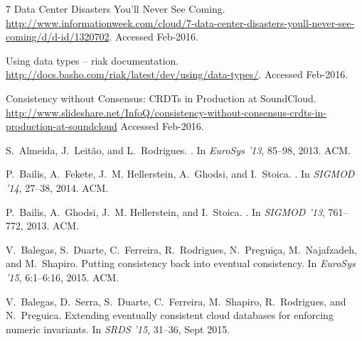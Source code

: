 \documentclass[11pt,dvipdfm]{article}
\begin{document}
\begin{thebibliography}{10}
\itemsep=1pt
\begin{small}


{7 Data Center Disasters You'll Never See Coming}.
\newblock
  \url{http://www.informationweek.com/cloud/7-data-center-disasters-youll-never-see-coming/d/d-id/1320702}.
\newblock Accessed Feb-2016.

Using data types -- riak documentation.
\newblock \url{http://docs.basho.com/riak/latest/dev/using/data-types/}.
\newblock Accessed Feb-2016.

Consistency without Consensus: CRDTs in Production at SoundCloud.
\newblock  \url{http://www.slideshare.net/InfoQ/consistency-without-consensus-crdts-in-production-at-soundcloud}
\newblock Accessed Feb-2016.

S.~Almeida, J.~Leit\~{a}o, and L.~Rodrigues.
.
  \newblock In {\em EuroSys '13}, 85--98, 2013. ACM.

P.~Bailis, A.~Fekete, J.~M. Hellerstein, A.~Ghodsi, and I.~Stoica.
.
\newblock In {\em SIGMOD '14}, 27--38, 2014. ACM.

P.~Bailis, A.~Ghodsi, J.~M. Hellerstein, and I.~Stoica.
.
\newblock In {\em SIGMOD '13}, 761--772, 2013. ACM.

V.~Balegas, S.~Duarte, C.~Ferreira, R.~Rodrigues, N.~Pregui\c{c}a,
  M.~Najafzadeh, and M.~Shapiro.
\newblock Putting consistency back into eventual consistency.
\newblock In {\em EuroSys '15}, 6:1--6:16, 2015. ACM.

V.~Balegas, D.~Serra, S.~Duarte, C.~Ferreira, M.~Shapiro, R.~Rodrigues, and
  N.~Preguica.
\newblock Extending eventually consistent cloud databases for enforcing numeric
  invariants.
\newblock In {\em SRDS '15}, 31--36, Sept 2015.


\end{small}
\end{thebibliography}
\end{document}
